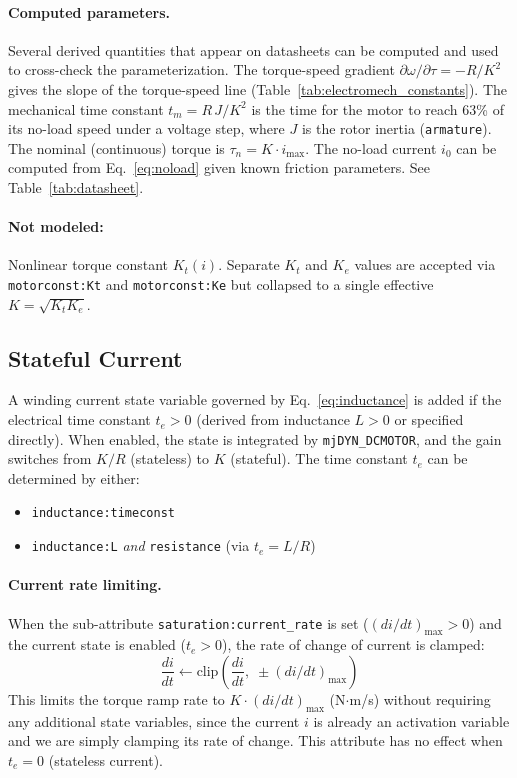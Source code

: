 \documentclass[10pt, a4paper, twocolumn]{article}
\let\oldtexttt\texttt
\renewcommand{\texttt}[1]{{\smaller\oldtexttt{#1}}}
\newcommand{\atR}{\texttt{resistance}}
\newcommand{\atKt}{\texttt{motorconst:Kt}}
\newcommand{\atKe}{\texttt{motorconst:Ke}}
\newcommand{\atCRATE}{\texttt{saturation:current\_rate}}
\newcommand{\atL}{\texttt{inductance:L}}
\newcommand{\atTE}{\texttt{inductance:timeconst}}
\begin{document}
\paragraph{Computed parameters.}
Several derived quantities that appear on datasheets can be computed and used to cross-check the parameterization. The torque-speed gradient $\partial\omega/\partial\tau = -R/K^2$ gives the slope of the torque-speed line (Table~\ref{tab:electromech_constants}). The mechanical time constant $t_m = R\,J/K^2$ is the time for the motor to reach 63\% of its no-load speed under a voltage step, where $J$ is the rotor inertia (\texttt{armature}). The nominal (continuous) torque is $\tau_n = K \cdot i_{\max}$. The no-load current $i_0$ can be computed from Eq.~\eqref{eq:noload} given known friction parameters. See Table~\ref{tab:datasheet}.

\paragraph{Not modeled:}
Nonlinear torque constant $K_t(i)$. Separate $K_t$ and $K_e$ values are accepted via \atKt{} and \atKe{} but collapsed to a single effective $K = \sqrt{K_t K_e}$.


\subsection{Stateful Current}
\label{sec:current_impl}

A winding current state variable governed by Eq.~\eqref{eq:inductance} is added if the electrical time constant $t_e > 0$ (derived from inductance $L > 0$ or specified directly). When enabled, the state is integrated by \texttt{mjDYN\_DCMOTOR}, and the gain switches from $K/R$ (stateless) to $K$ (stateful).
The time constant $t_e$ can be determined by either:

\begin{itemize}[itemsep=0pt, parsep=0pt, topsep=2pt]
  \item \atTE{}
  \item \atL{} \emph{and} \atR{} (via $t_e = L/R$)
\end{itemize}

\paragraph{Current rate limiting.} When the sub-attribute \atCRATE{} is set ($(di/dt)_{\max} > 0$) and the current state is enabled ($t_e > 0$), the rate of change of current is clamped:
\begin{equation*}
  \frac{di}{dt} \leftarrow \text{clip}\!\left(\frac{di}{dt},\; \pm(di/dt)_{\max}\right)
\end{equation*}
This limits the torque ramp rate to $K \cdot (di/dt)_{\max}$ (N$\cdot$m/s) without requiring any additional state variables, since the current $i$ is already an activation variable and we are simply clamping its rate of change. This attribute has no effect when $t_e = 0$ (stateless current).
\end{document}
